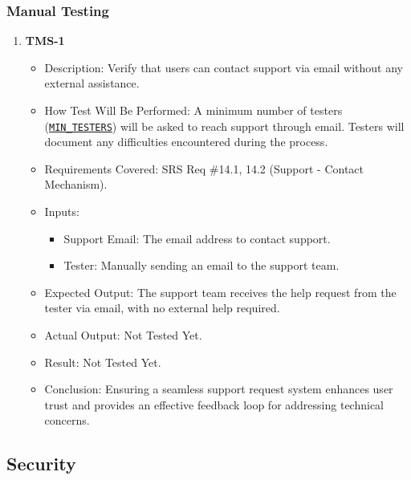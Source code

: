 \documentclass[12pt, titlepage]{article}
\begin{document}
\subsubsection{Manual Testing}
\begin{enumerate}
    \item \textbf{TMS-1}  
    \begin{itemize}
        \item Description: Verify that users can contact support via email without any external assistance.
        \item How Test Will Be Performed: A minimum number of testers (\hyperref[MIN_TESTERS]{\texttt{MIN\_TESTERS}}) will be asked to reach support through email. Testers will document any difficulties encountered during the process.
        \item Requirements Covered: SRS Req \#14.1, 14.2 (Support - Contact Mechanism).
        \item Inputs:  
            \begin{itemize}
                \item Support Email: The email address to contact support.
                \item Tester: Manually sending an email to the support team.
            \end{itemize}
        \item Expected Output: The support team receives the help request from the tester via email, with no external help required.
        \item Actual Output: Not Tested Yet.
        \item Result: Not Tested Yet.
        \item Conclusion: Ensuring a seamless support request system enhances user trust and provides an effective feedback loop for addressing technical concerns.
    \end{itemize}
\end{enumerate}

\subsection{Security}
\end{document}
